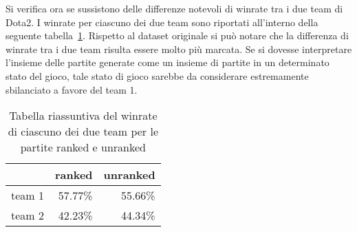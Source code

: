 Si verifica ora se sussistono delle differenze notevoli di winrate tra i due team di Dota2. I winrate per ciascuno dei due team sono riportati all'interno della seguente tabella~\ref{winrate_team_sintetico}. Rispetto al dataset originale si può notare che la differenza di winrate tra i due team risulta essere molto più marcata. Se si dovesse interpretare l'insieme delle partite generate come un insieme di partite in un determinato stato del gioco, tale stato di gioco sarebbe da considerare estremamente sbilanciato a favore del team 1. 
\begin{table}
\centering
\caption{Tabella riassuntiva del winrate di ciascuno dei due team per le partite ranked e unranked}
\label{winrate_team_sintetico}
\begin{tabular}{|r|r|r|}
\hline
\multicolumn{1}{|l|}{} & \multicolumn{1}{l|}{ranked} & \multicolumn{1}{l|}{unranked} \\ \hline
team 1  &  57.77\%  &   55.66\% \\ \hline
team 2  &  42.23\%  &   44.34\%  \\ \hline
\end{tabular}
\end{table}